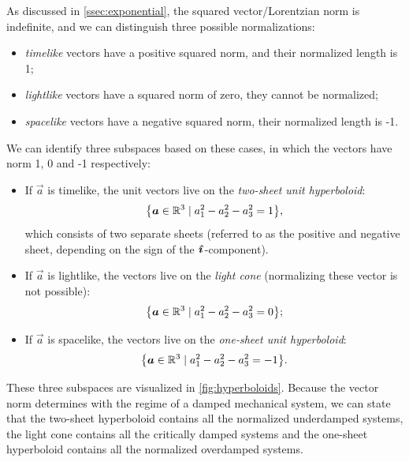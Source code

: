 As discussed in \cref{ssec:exponential}, the squared vector/Lorentzian norm is indefinite, and we can distinguish three possible normalizations:
\begin{itemize}
    \item \emph{timelike} vectors have a positive squared norm, and their normalized length is 1;
    \item \emph{lightlike} vectors have a squared norm of zero, they cannot be normalized;
    \item \emph{spacelike} vectors have a negative squared norm, their normalized length is -1.
\end{itemize}
We can identify three subspaces based on these cases, in which the vectors have norm 1, 0 and -1 respectively: 
\begin{itemize}
    \item If $\vec{a}$ is timelike, the unit vectors live on the \emph{two-sheet unit hyperboloid}:
        $$ \qty{\vec{a} \in \real^3 \mid a_1^2 - a_2^2 - a_3^2 = 1},$$
        which consists of two separate sheets (referred to as the positive and negative sheet, depending on the sign of the $\quati$-component).
    \item If $\vec{a}$ is lightlike, the vectors live on the \emph{light cone} (normalizing these vector is not possible):
        $$ \qty{\vec{a} \in \real^3 \mid a_1^2 - a_2^2 - a_3^2 = 0}; $$
    \item If $\vec{a}$ is spacelike, the vectors live on the \emph{one-sheet unit hyperboloid}:
        $$ \qty{\vec{a} \in \real^3 \mid a_1^2 - a_2^2 - a_3^2 = -1}. $$
\end{itemize}
These three subspaces are visualized in \cref{fig:hyperboloids}. Because the vector norm determines with the regime of a damped mechanical system, we can state that the two-sheet hyperboloid contains all the normalized underdamped systems, the light cone contains all the critically damped systems and the one-sheet hyperboloid contains all the normalized overdamped systems.

